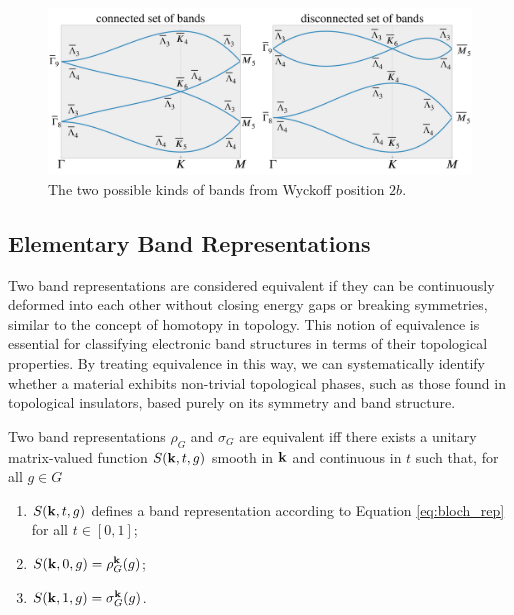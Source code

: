 \begin{figure}[H]
\centering
\includegraphics[width=\linewidth]{fig/bands_con_discon.png}
\caption{The two possible kinds of bands from Wyckoff position $2b$.}
\label{fig:bands_con_discon}
\end{figure}








\subsection{Elementary Band Representations}

Two band representations are considered equivalent if they can be continuously deformed into each other without closing energy gaps or breaking symmetries, similar to the concept of homotopy in topology. This notion of equivalence is essential for classifying electronic band structures in terms of their topological properties. By treating equivalence in this way, we can systematically identify whether a material exhibits non-trivial topological phases, such as those found in topological insulators, based purely on its symmetry and band structure.

\begin{definition} \label{def:equiv_bandrep}
Two band representations $\rho_G$ and $\sigma_G$ are equivalent iff there exists a unitary matrix-valued function $S({\vb{k}},t,g)$ smooth in ${\vb{k}}$ and continuous in $t$ such that, for all $g \in G$
\begin{enumerate}
\item $S({\vb{k}}, t, g)$ defines a band representation according to Equation \ref{eq:bloch_rep} for all $t \in [0,1]$;
\item $S({\vb{k}}, 0, g) = \rho_G^{\vb{k}}(g)$;
\item $S({\vb{k}}, 1, g) = \sigma_G^{\vb{k}}(g)$.
\end{enumerate}
\end{definition}

